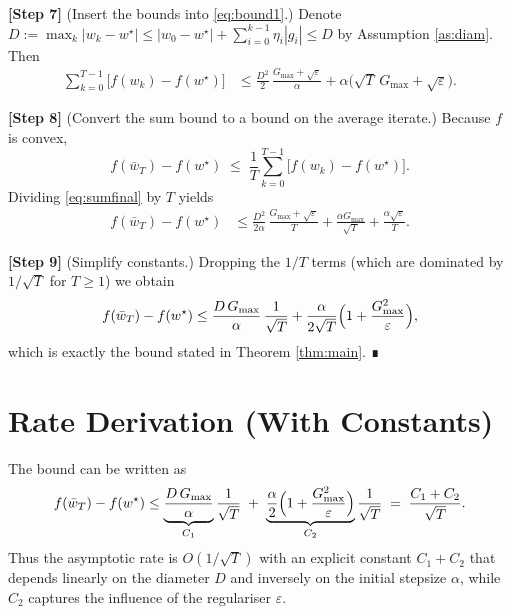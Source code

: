 \documentclass{article}
\begin{document}
\noindent\textbf{[Step 7]} (Insert the bounds into \eqref{eq:bound1}.)  
Denote $D:=\max_{k}|w_k-w^{\star}|\le |w_0-w^{\star}|+ \sum_{i=0}^{k-1}\eta_i|g_i|
\le D$ by Assumption \ref{as:diam}. Then
\begin{align}
\sum_{k=0}^{T-1}\!\bigl[f(w_k)-f(w^{\star})\bigr]
&\le
\frac{D^{2}}{2}\,\frac{G_{\max}+\sqrt{\varepsilon}}{\alpha}
+\alpha\bigl(\sqrt{T}\,G_{\max}+\sqrt{\varepsilon}\bigr). \label{eq:sumfinal}
\end{align}

\noindent\textbf{[Step 8]} (Convert the sum bound to a bound on the average iterate.)  
Because $f$ is convex,
\[
f(\bar w_T)-f(w^{\star})
\;\le\;
\frac{1}{T}\sum_{k=0}^{T-1}\!\bigl[f(w_k)-f(w^{\star})\bigr].
\]
Dividing \eqref{eq:sumfinal} by $T$ yields
\begin{align}
f(\bar w_T)-f(w^{\star})
&\le
\frac{D^{2}}{2\alpha}\,\frac{G_{\max}+\sqrt{\varepsilon}}{T}
+\frac{\alpha G_{\max}}{\sqrt{T}}
+\frac{\alpha\sqrt{\varepsilon}}{T}. \label{eq:avg}
\end{align}

\noindent\textbf{[Step 9]} (Simplify constants.)  
Dropping the $1/T$ terms (which are dominated by $1/\sqrt{T}$ for $T\ge1$) we obtain
\[
f(\bar w_T)-f(w^{\star})
\le
\frac{D\,G_{\max}}{\alpha}\,\frac{1}{\sqrt{T}}
+\frac{\alpha}{2\sqrt{T}}\Bigl(1+\frac{G_{\max}^{2}}{\varepsilon}\Bigr),
\]
which is exactly the bound stated in Theorem \ref{thm:main}. ∎

\section*{Rate Derivation (With Constants)}
The bound can be written as
\[
f(\bar w_T)-f(w^{\star})
\le
\underbrace{\frac{D\,G_{\max}}{\alpha}}_{C_1}\frac{1}{\sqrt{T}}
\;+\;
\underbrace{\frac{\alpha}{2}\Bigl(1+\frac{G_{\max}^{2}}{\varepsilon}\Bigr)}_{C_2}\frac{1}{\sqrt{T}}
\;=\;
\frac{C_1+C_2}{\sqrt{T}}.
\]
Thus the asymptotic rate is $O(1/\sqrt{T})$ with an explicit constant
$C_1+C_2$ that depends linearly on the diameter $D$ and inversely on the
initial stepsize $\alpha$, while $C_2$ captures the influence of the
regulariser $\varepsilon$.
\end{document}
